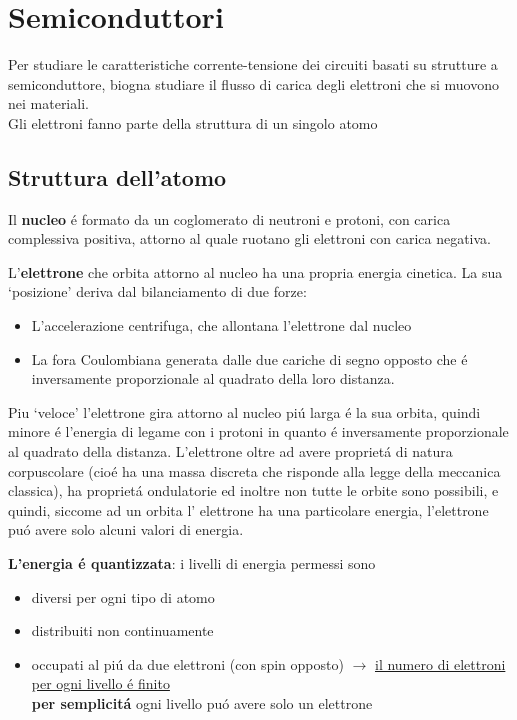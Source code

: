 \section{Semiconduttori}
Per studiare le caratteristiche corrente-tensione dei circuiti basati su strutture a semiconduttore, biogna studiare il flusso di carica degli elettroni che si muovono nei materiali.\\
Gli elettroni fanno parte della struttura di un singolo atomo

\subsection{Struttura dell'atomo}

Il \textbf{nucleo} \'e formato da un coglomerato di neutroni e protoni, con carica complessiva positiva, attorno al quale ruotano gli elettroni con carica negativa.

L'\textbf{elettrone} che orbita attorno al nucleo ha una propria energia cinetica. La sua `posizione' deriva dal bilanciamento di due forze:
\begin{itemize}
    \item L'accelerazione centrifuga, che allontana l'elettrone dal nucleo
    \item La fora Coulombiana generata dalle due cariche di segno opposto che \'e inversamente proporzionale al quadrato della loro distanza.
\end{itemize}

Piu `veloce' l'elettrone gira attorno al nucleo pi\'u larga \'e la sua orbita, quindi minore \'e l'energia di legame con i protoni in quanto \'e inversamente proporzionale al quadrato della distanza.
L'elettrone oltre ad avere propriet\'a di natura corpuscolare (cio\'e ha una massa discreta che risponde alla legge della meccanica classica), ha propriet\'a ondulatorie ed inoltre non tutte le orbite sono possibili, e quindi, siccome ad un orbita l' elettrone ha una particolare energia, l'elettrone pu\'o avere solo alcuni valori di energia.

\textbf{L'energia \'e quantizzata}: i livelli di energia permessi sono
\begin{itemize}
    \item diversi per ogni tipo di atomo
    \item distribuiti non continuamente
    \item occupati al pi\'u da due elettroni (con spin opposto) $\rightarrow$ \underline{il numero di elettroni per ogni livello \'e finito}\\
        \textbf{per semplicit\'a} ogni livello pu\'o avere solo un elettrone
\end{itemize}

